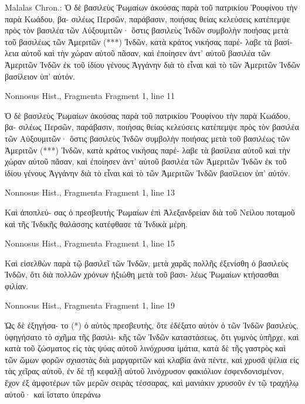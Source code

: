 \documentclass[12pt,letterpaper,twoside,final]{memoir}
\begin{document}
\begin{greek}

Malalas Chron.: 
Ὁ δὲ βασιλεὺς Ῥωμαίων ἀκούσας 
παρὰ τοῦ πατρικίου Ῥουφίνου τὴν παρὰ Κωάδου, βα-
σιλέως Περσῶν, παράβασιν, ποιήσας θείας κελεύσεις 
κατέπεμψε πρὸς τὸν βασιλέα τῶν Αὐξουμιτῶν· ὅστις 
βασιλεὺς Ἰνδῶν συμβολὴν ποιήσας μετὰ τοῦ βασιλέως 
τῶν Ἀμεριτῶν (***) Ἰνδῶν, κατὰ κράτος νικήσας παρέ-
λαβε τὰ βασίλεια αὐτοῦ καὶ τὴν χώραν αὐτοῦ πᾶσαν, 
καὶ ἐποίησεν ἀντ' αὐτοῦ βασιλέα τῶν Ἀμεριτῶν Ἰνδῶν 
ἐκ τοῦ ἰδίου γένους Ἀγγάνην διὰ τὸ εἶναι καὶ τὸ τῶν 
Ἀμεριτῶν Ἰνδῶν βασίλειον ὑπ' αὐτόν. 



Nonnosus Hist., Fragmenta 
Fragment 1, line 11

Ὁ δὲ βασιλεὺς Ῥωμαίων ἀκούσας 
παρὰ τοῦ πατρικίου Ῥουφίνου τὴν παρὰ Κωάδου, βα-
σιλέως Περσῶν, παράβασιν, ποιήσας θείας κελεύσεις 
κατέπεμψε πρὸς τὸν βασιλέα τῶν Αὐξουμιτῶν· ὅστις 
βασιλεὺς Ἰνδῶν συμβολὴν ποιήσας μετὰ τοῦ βασιλέως 
τῶν Ἀμεριτῶν (***) Ἰνδῶν, κατὰ κράτος νικήσας παρέ-
λαβε τὰ βασίλεια αὐτοῦ καὶ τὴν χώραν αὐτοῦ πᾶσαν, 
καὶ ἐποίησεν ἀντ' αὐτοῦ βασιλέα τῶν Ἀμεριτῶν Ἰνδῶν 
ἐκ τοῦ ἰδίου γένους Ἀγγάνην διὰ τὸ εἶναι καὶ τὸ τῶν 
Ἀμεριτῶν Ἰνδῶν βασίλειον ὑπ' αὐτόν. 



Nonnosus Hist., Fragmenta 
Fragment 1, line 13

                                              Καὶ ἀποπλεύ-
σας ὁ πρεσβευτὴς Ῥωμαίων ἐπὶ Ἀλεξανδρείαν διὰ τοῦ 
Νείλου ποταμοῦ καὶ τῆς Ἰνδικῆς θαλάσσης κατέφθασε 
τὰ Ἰνδικὰ μέρη. 



Nonnosus Hist., Fragmenta 
Fragment 1, line 15

                     Καὶ εἰσελθὼν παρὰ τῷ βασιλεῖ 
τῶν Ἰνδῶν, μετὰ χαρᾶς πολλῆς ἐξενίσθη ὁ βασιλεὺς 
Ἰνδῶν, ὅτι διὰ πολλῶν χρόνων ἠξιώθη μετὰ τοῦ βασι-
λέως Ῥωμαίων κτήσασθαι φιλίαν. 



Nonnosus Hist., Fragmenta 
Fragment 1, line 19

                                     Ὡς δὲ ἐξηγήσα-
το (*) ὁ αὐτὸς πρεσβευτὴς, ὅτε ἐδέξατο αὐτὸν ὁ τῶν 
Ἰνδῶν βασιλεὺς, ὑφηγήσατο τὸ σχῆμα τῆς βασιλι-
κῆς τῶν Ἰνδῶν καταστάσεως, ὅτι γυμνὸς ὑπῆρχε, 
καὶ κατὰ τοῦ ζώσματος εἰς τὰς ψύας αὐτοῦ λινόχρυσα 
ἱμάτια, κατὰ δὲ τῆς γαστρὸς καὶ τῶν ὤμων φορῶν 
σχιαστὰς διὰ μαργαριτῶν καὶ 
κλαβία ἀνὰ πέντε, καὶ 
χρυσᾶ ψέλια εἰς τὰς χεῖρας αὐτοῦ, ἐν δὲ τῇ κεφαλῇ 
αὐτοῦ λινόχρυσον φακιόλιον ἐσφενδονισμένον, ἔχον ἐξ 
ἀμφοτέρων τῶν μερῶν σειρὰς τέσσαρας, καὶ μανιάκιν 
χρυσοῦν ἐν τῷ τραχήλῳ αὐτοῦ· καὶ ἵστατο ὑπεράνω 





\end{greek}
\end{document}
